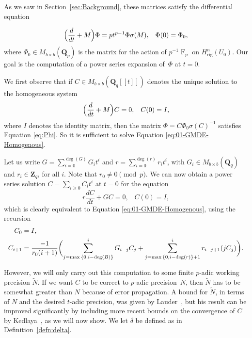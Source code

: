 \documentclass[a4paper,11pt]{article}
\numberwithin{equation}{section}
\newcommand{\ZZ}{\mathbf{Z}} %
\newcommand{\QQ}{\mathbf{Q}} %
\DeclareMathOperator{\Frob}{F}           %
\providecommand{\Hrig}{H_{\text{rig}}}  %
\theoremstyle{definition}
\begin{document}
As we saw in Section~\ref{sec:Background}, these matrices satisfy the differential equation

\begin{equation} \label{eq:Phi}
\Bigl(\frac{d}{dt} + M\Bigr) \Phi = p t^{p-1} \Phi \sigma(M), \;\;\; \Phi(0)=\Phi_0,
\end{equation}
where $\Phi_0 \in M_{b \times b}(\QQ_p)$ is the matrix for the action of $p^{-1} \Frob_p$ 
on $\Hrig^n(U_0)$. Our goal is 
the computation of a power series expansion of~$\Phi$ at $t=0$.

We first observe that if $C \in M_{b \times b}(\QQ_q[[t]])$ denotes the unique solution to the 
homogeneous system
\begin{equation} \label{eq:01-GMDE-Homogenous}
\Bigl(\frac{d}{dt} + M\Bigr) C = 0, \;\;\; C(0)=I,
\end{equation}
where $I$ denotes the identity matrix, then the matrix
$\Phi = C \Phi_0 \sigma(C)^{-1}$
satisfies Equation \eqref{eq:Phi}. So it is sufficient to solve Equation 
\eqref{eq:01-GMDE-Homogenous}.

Let us write $G = \sum_{i=0}^{\deg(G)} G_i t^i$ and $r= \sum_{i=0}^{\deg(r)} r_i t^i$,
with $G_i \in M_{b \times b}(\QQ_q)$ and $r_i \in \ZZ_q$, for all $i$. Note that
$r_0 \neq 0 \pmod{p}$.
We can now obtain a power series solution $C = \sum_{i \geq 0} C_i t^i$ at $t=0$ for 
the equation
\begin{equation*}
r \frac{dC}{dt} + G C = 0, \;\;\; C(0)=I,
\end{equation*}
which is clearly equivalent to Equation \eqref{eq:01-GMDE-Homogenous}, using the recursion 
\begin{align}
C_0 &= I, \notag \\ 
C_{i+1} &= \frac{-1}{r_0 (i+1)} \biggl(
    \sum_{j=\max{\{0,i-\deg(B)\}}}^i G_{i-j} C_j + 
    \sum_{j=\max{\{0,i-\deg(r)\}}+1}^i r_{i-j+1} (j C_j) \biggr). \label{eq:recursiondifeq}
\end{align}

However, we will only carry out this computation to some finite $p$-adic 
working precision $\tilde{N}$. If we want $C$ to be correct to $p$-adic 
precision~$N$, then $\tilde{N}$ has to be somewhat greater than $N$ because 
of error propagation. A bound for $\tilde{N}$, in terms of $N$ and the 
desired $t$-adic precision, was given by Lauder~\citep[Theorem~5.1]{Lauder2006}, 
but his result can be improved significantly by including more recent bounds 
on the convergence of $C$ by Kedlaya~\citep{Kedlaya2010}, as we will now show. 
We let $\delta$ be defined as in Definition~\ref{defn:delta}. 
\end{document}
